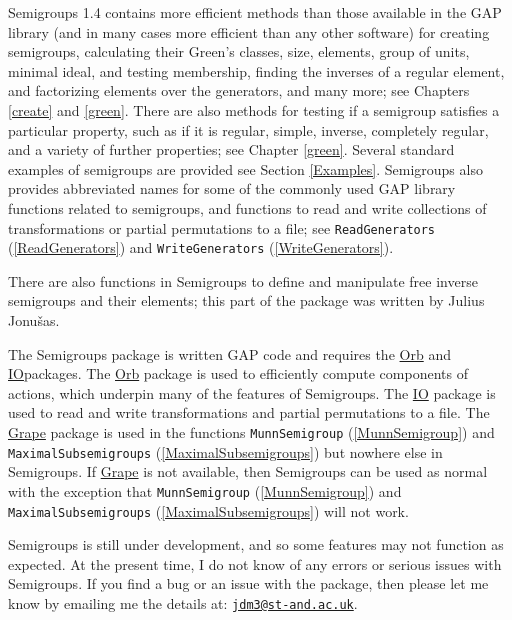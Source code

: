 \documentclass[a4paper,11pt]{report}
\begin{document}
{{ \noindent \textsf{Semigroups} 1.4 contains more efficient methods than those available in the \textsf{GAP} library (and in many cases more efficient than any other software) for
creating semigroups, calculating their Green's classes, size, elements, group
of units, minimal ideal, and testing membership, finding the inverses of a
regular element, and factorizing elements over the generators, and many more;
see Chapters \ref{create} and \ref{green}. There are also methods for testing if a semigroup satisfies a particular
property, such as if it is regular, simple, inverse, completely regular, and a
variety of further properties; see Chapter \ref{green}. Several standard examples of semigroups are provided see Section \ref{Examples}. \textsf{Semigroups} also provides abbreviated names for some of the commonly used \textsf{GAP} library functions related to semigroups, and functions to read and write
collections of transformations or partial permutations to a file; see \texttt{ReadGenerators} (\ref{ReadGenerators}) and \texttt{WriteGenerators} (\ref{WriteGenerators}). 

 There are also functions in \textsf{Semigroups} to define and manipulate free inverse semigroups and their elements; this part
of the package was written by Julius Jonu{\v s}as.

 \noindent The \textsf{Semigroups} package is written \textsf{GAP} code and requires the \href{ http://www-groups.mcs.st-and.ac.uk/~neunhoef/Computer/Software/Gap/orb.html } {Orb} and \href{ http://www-groups.mcs.st-and.ac.uk/~neunhoef/Computer/Software/Gap/io.html } {IO}packages. The \href{ http://www-groups.mcs.st-and.ac.uk/~neunhoef/Computer/Software/Gap/orb.html } {Orb} package is used to efficiently compute components of actions, which underpin
many of the features of \textsf{Semigroups}. The \href{ http://www-groups.mcs.st-and.ac.uk/~neunhoef/Computer/Software/Gap/io.html } {IO} package is used to read and write transformations and partial permutations to
a file. The \href{http://www.maths.qmul.ac.uk/~leonard/grape/} {Grape} package is used in the functions \texttt{MunnSemigroup} (\ref{MunnSemigroup}) and \texttt{MaximalSubsemigroups} (\ref{MaximalSubsemigroups}) but nowhere else in \textsf{Semigroups}. If \href{http://www.maths.qmul.ac.uk/~leonard/grape/} {Grape} is not available, then \textsf{Semigroups} can be used as normal with the exception that \texttt{MunnSemigroup} (\ref{MunnSemigroup}) and \texttt{MaximalSubsemigroups} (\ref{MaximalSubsemigroups}) will not work. 

 \textsf{Semigroups} is still under development, and so some features may not function as expected.
At the present time, I do not know of any errors or serious issues with \textsf{Semigroups}. If you find a bug or an issue with the package, then please let me know by
emailing me the details at: \href{mailto://jdm3@st-and.ac.uk} {\texttt{jdm3@st-and.ac.uk}}.

}}
\end{document}
